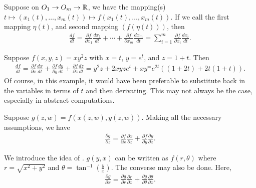 \begin{example}
    Suppose on $O_{1} \to O_{m} \to \mathbb{R}$, we have the mapping(s) $t \mapsto (x_{1}(t),\ldots,x_{m}(t)) \mapsto f(x_{1}(t),\ldots,x_{m}(t))$. If we call the first mapping $\eta(t)$, and second mapping $(f(\eta(t)))$, then
    \begin{align}
        \frac{df}{dt} = \frac{\partial f}{\partial x_{1}}\frac{dx_{1}}{dt} + \cdots + \frac{\partial f}{\partial x_{m}}\frac{dx_{m}}{dt} = \sum_{i=1}^{m} \frac{\partial f}{\partial x_{i}} \frac{dx_{i}}{dt}.
    \end{align}
\end{example}

\begin{example}
    Suppose $f(x,y,z) = xy^{2}z$ with $x = t$, $y = e^{t}$, and $z = 1+t$. Then
    \begin{align}
        \frac{df}{dt} = \frac{\partial f}{\partial x} \frac{dx}{dt} + \frac{\partial f}{\partial y} \frac{dy}{dt} + \frac{\partial f}{\partial z} \frac{dz}{dt} = y^{2}z + 2xyze^{t} + xy^ = e^{2t}((1+2t)+2t(1+t)).
    \end{align}
    Of course, in this example, it would have been preferable to substitute back in the variables in terms of $t$ and then derivating. This may not always be the case, especially in abstract computations.
\end{example}

\begin{example}
    Suppose $g(z,w) = f(x(z,w),y(z,w))$. Making all the necessary assumptions, we have
    \begin{align}
        \frac{\partial g}{\partial z} = \frac{\partial f}{\partial x} \frac{\partial x}{\partial z} + \frac{\partial f}{\partial y} \frac{\partial y}{\partial z}.
    \end{align}
\end{example}

\begin{example}
    We introduce the idea of . $g(y,x)$ can be written as $f(r,\theta)$ where $r = \sqrt{x^{2}+y^{2}}$ and $\theta = \tan^{-1}(\frac{y}{x})$. The converse may also be done. Here,
    \begin{align}
        \frac{\partial g}{\partial x} = \frac{\partial g}{\partial r} \frac{\partial r}{\partial x} + \frac{\partial g}{\partial \theta} \frac{\partial \theta}{\partial x}.
    \end{align}
\end{example}

